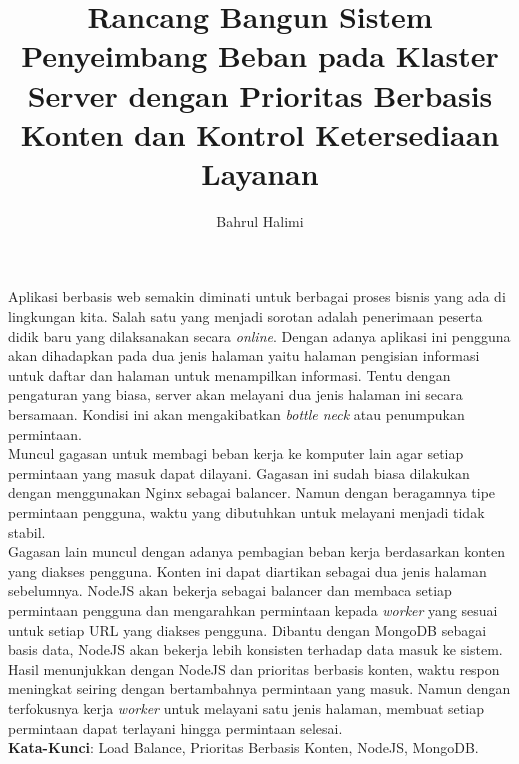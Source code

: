 \documentclass{ta-its}
\title{Rancang Bangun Sistem Penyeimbang Beban pada Klaster Server dengan Prioritas Berbasis Konten dan Kontrol Ketersediaan Layanan}{Design and Implementation of Load Balancing System with Content Priority and Availability Control}{KI1502}
\author{Bahrul Halimi}{5111100014}
\begin{document}
    \frontmatter %
    \maketitle
    \legalityPaper %
    \begin{abstrak}
    	Aplikasi berbasis web semakin diminati untuk berbagai proses bisnis yang ada di lingkungan kita. Salah satu yang menjadi sorotan adalah penerimaan peserta didik baru yang dilaksanakan secara \textit{online}. Dengan adanya aplikasi ini pengguna akan dihadapkan pada dua jenis halaman yaitu halaman pengisian informasi untuk daftar dan halaman untuk menampilkan informasi. Tentu dengan pengaturan yang biasa, server akan melayani dua jenis halaman ini secara bersamaan. Kondisi ini akan mengakibatkan \textit{bottle neck} atau penumpukan permintaan. \\
	    Muncul gagasan untuk membagi beban kerja ke komputer lain agar setiap permintaan yang masuk dapat dilayani. Gagasan ini sudah biasa dilakukan dengan menggunakan Nginx sebagai balancer. Namun dengan beragamnya tipe permintaan pengguna, waktu yang dibutuhkan untuk melayani menjadi tidak stabil. \\
	    Gagasan lain muncul dengan adanya pembagian beban kerja berdasarkan konten yang diakses pengguna. Konten ini dapat diartikan sebagai dua jenis halaman sebelumnya. NodeJS akan bekerja sebagai balancer dan membaca setiap permintaan pengguna dan mengarahkan permintaan kepada \textit{worker} yang sesuai untuk setiap URL yang diakses pengguna. Dibantu dengan MongoDB sebagai basis data, NodeJS akan bekerja lebih konsisten terhadap data masuk ke sistem. \\
	    Hasil menunjukkan dengan NodeJS dan prioritas berbasis konten, waktu respon meningkat seiring dengan bertambahnya permintaan yang masuk. Namun dengan terfokusnya kerja \textit{worker} untuk melayani satu jenis halaman, membuat setiap permintaan dapat terlayani hingga permintaan selesai. \\
    	
    	\noindent \textbf{Kata-Kunci}: Load Balance, Prioritas Berbasis Konten, NodeJS, MongoDB.
	\end{abstrak}
	
\end{document}
